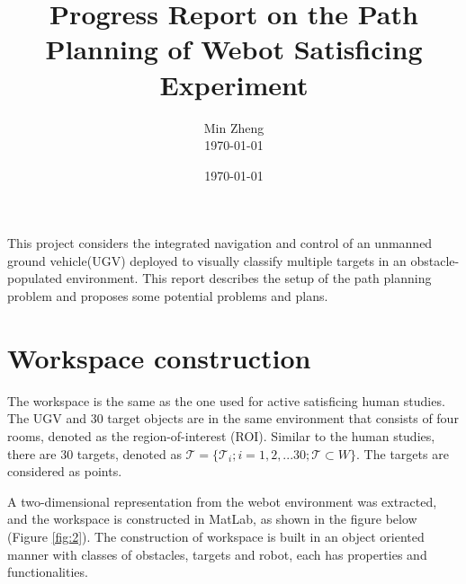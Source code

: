 \documentclass[12pt,draftcls,onecolumn]{IEEEtran}
\begin{document}
\title{Progress Report on the Path Planning of Webot Satisficing Experiment }


\author{  Min Zheng \\  \today}

\date{\today}

\maketitle




This project considers the integrated navigation and control of an unmanned ground vehicle(UGV) deployed to visually classify multiple targets in an obstacle-populated environment. 
This report describes the setup of the path planning problem and proposes some potential problems and plans. 

\section{Workspace construction} 

The workspace is the same as the one used for active satisficing human studies. 
The UGV and 30 target objects are in the same environment that consists of four rooms, denoted as the region-of-interest (ROI).
Similar to the human studies, there are 30 targets, denoted as $\mathcal{T} = \{\mathcal{T}_i; i = 1,2,...30; \mathcal{T} \subset W \}$.
The targets are considered as points.

A two-dimensional representation from the webot environment was extracted, and the workspace is constructed in MatLab, as shown in the figure below  (Figure \ref{fig:2}). 
The construction of workspace is built in an object oriented manner with classes of obstacles, targets and robot, each has properties and functionalities.  
\end{document}
